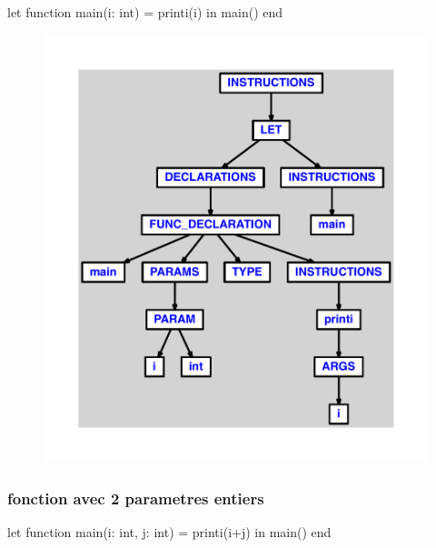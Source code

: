 \documentclass{article}
\begin{document}
\begin{verbatimtab}
let
	function main(i: int) = printi(i)
in main() end
\end{verbatimtab}
\begin{figure}[H]\centering\includegraphics[max width=\textwidth]{ast/ast_224.pdf}\end{figure}\subsubsection{fonction avec 2 parametres entiers}
\begin{verbatimtab}
let
	function main(i: int, j: int) = printi(i+j)
in main() end
\end{verbatimtab}
\end{document}
